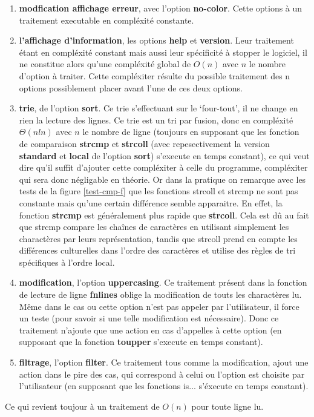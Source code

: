 \documentclass[12pt]{article}
\begin{document}
    \begin{enumerate}
        \item[] \textbf{modfication affichage erreur},  avec l'option 
        \textbf{no-color}. Cette options à un traitement executable en 
        compléxité constante.
        \item[] \textbf{l'affichage d'information}, les options \textbf{help} et 
        \textbf{version}. Leur traitement étant en compléxité constant mais 
        aussi leur spécificité à stopper le logiciel, il ne constitue alors 
        qu'une compléxité global de $O(n)$ avec $n$ le nombre d'option à 
        traiter. Cette compléxiter résulte du possible traitement des n options 
        possiblement placer avant l'une de ces deux options.
        \item[] \textbf{trie}, de l'option \textbf{sort}. Ce trie s'effectuant 
        sur le `four-tout', il ne change en rien la lecture des lignes. Ce trie 
        est un tri par fusion, donc en compléxité $\Theta(nln)$ avec $n$ le 
        nombre de ligne (toujours en supposant que les fonction de comparaison 
        \textbf{strcmp} et \textbf{strcoll} (avec repesectivement la version 
        \textbf{standard} et \textbf{local} de l'option \textbf{sort}) 
        s'execute en temps constant), ce qui veut dire qu'il suffit d'ajouter 
        cette compléxiter à celle du programme, compléxiter qui sera donc 
        négligable en théorie. Or dans la pratique on remarque avec les tests de
         la figure \ref{test-cmp-f} que les fonctions strcoll et strcmp ne sont 
        pas constante mais qu'une certain différence semble apparaitre. En
        effet, la fonction \textbf{strcmp} est généralement plus rapide que 
        \textbf{strcoll}. Cela est dû au fait que strcmp compare les chaînes de 
        caractères en utilisant simplement les charactères par leurs 
        représentation, tandis que strcoll prend en compte les différences 
        culturelles dans l'ordre des caractères et utilise des règles de tri 
        spécifiques à l'ordre local.        
        \item[] \textbf{modification}, l'option \textbf{uppercasing}. Ce 
        traitement présent dans la fonction de lecture de ligne \textbf{fnlines} 
        oblige la modification de touts les charactères lu. Même dans le cas ou 
        cette option n'est pas appeler par l'utilisateur, il force un teste 
        (pour savoir si une telle modification est nécessaire). Donc ce 
        traitement n'ajoute que une action en cas d'appelles à cette option (en 
        supposant que la fonction \textbf{toupper} s'execute en temps constant).
        \item[] \textbf{filtrage}, l'option \textbf{filter}. Ce traitement tous 
        comme la modification, ajout une action dans le pire des cas, qui 
        correspond à celui ou l'option est choisite par l'utilisateur (en 
        supposant que les fonctions is... s'éxecute en temps constant). 
    \end{enumerate}
    Ce qui revient toujour à un traitement de $O(n)$ pour toute ligne lu.
\end{document}
